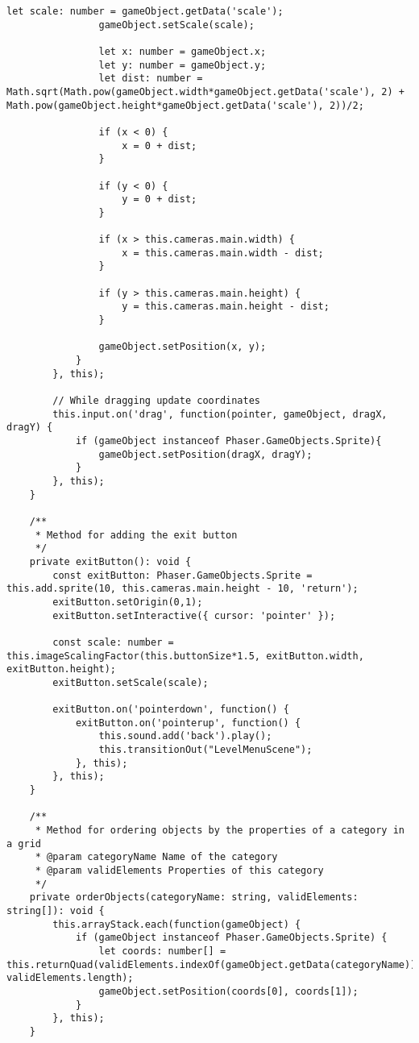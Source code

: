 \begin{lstlisting}[style=TypeScript, caption={sortingScene.ts}]
                let scale: number = gameObject.getData('scale');
                gameObject.setScale(scale);

                let x: number = gameObject.x;
                let y: number = gameObject.y;
                let dist: number = Math.sqrt(Math.pow(gameObject.width*gameObject.getData('scale'), 2) + Math.pow(gameObject.height*gameObject.getData('scale'), 2))/2;

                if (x < 0) {
                    x = 0 + dist;
                }

                if (y < 0) {
                    y = 0 + dist;
                }

                if (x > this.cameras.main.width) {
                    x = this.cameras.main.width - dist;
                }

                if (y > this.cameras.main.height) {
                    y = this.cameras.main.height - dist;
                }

                gameObject.setPosition(x, y);
            }
        }, this);

        // While dragging update coordinates
        this.input.on('drag', function(pointer, gameObject, dragX, dragY) {
            if (gameObject instanceof Phaser.GameObjects.Sprite){
                gameObject.setPosition(dragX, dragY);
            }
        }, this);
    }

    /**
     * Method for adding the exit button
     */
    private exitButton(): void {
        const exitButton: Phaser.GameObjects.Sprite = this.add.sprite(10, this.cameras.main.height - 10, 'return');
        exitButton.setOrigin(0,1);
        exitButton.setInteractive({ cursor: 'pointer' });

        const scale: number = this.imageScalingFactor(this.buttonSize*1.5, exitButton.width, exitButton.height);
        exitButton.setScale(scale);

        exitButton.on('pointerdown', function() {
            exitButton.on('pointerup', function() {
                this.sound.add('back').play();
                this.transitionOut("LevelMenuScene");
            }, this);
        }, this);
    }

    /**
     * Method for ordering objects by the properties of a category in a grid
     * @param categoryName Name of the category
     * @param validElements Properties of this category
     */
    private orderObjects(categoryName: string, validElements: string[]): void {
        this.arrayStack.each(function(gameObject) {
            if (gameObject instanceof Phaser.GameObjects.Sprite) {
                let coords: number[] = this.returnQuad(validElements.indexOf(gameObject.getData(categoryName)), validElements.length);
                gameObject.setPosition(coords[0], coords[1]);
            }
        }, this);
    }


\end{lstlisting}
